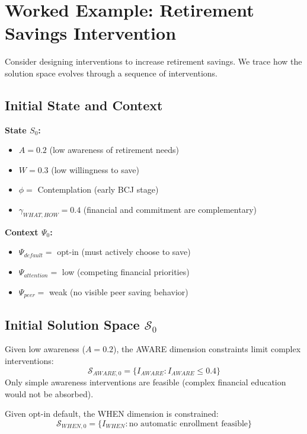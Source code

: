 \section{Worked Example: Retirement Savings Intervention}
\label{sec:ss-example}

Consider designing interventions to increase retirement savings. We trace how the solution space evolves through a sequence of interventions.

\subsection{Initial State and Context}

\textbf{State $S_0$:}
\begin{itemize}
    \item $A = 0.2$ (low awareness of retirement needs)
    \item $W = 0.3$ (low willingness to save)
    \item $\phi = $ Contemplation (early BCJ stage)
    \item $\gamma_{WHAT,HOW} = 0.4$ (financial and commitment are complementary)
\end{itemize}

\textbf{Context $\Psi_0$:}
\begin{itemize}
    \item $\Psi_{default} = $ opt-in (must actively choose to save)
    \item $\Psi_{attention} = $ low (competing financial priorities)
    \item $\Psi_{peer} = $ weak (no visible peer saving behavior)
\end{itemize}

\subsection{Initial Solution Space $\mathcal{S}_0$}

Given low awareness ($A = 0.2$), the AWARE dimension constraints limit complex interventions:
\begin{equation}
\mathcal{S}_{AWARE,0} = \{I_{AWARE} : I_{AWARE} \leq 0.4\}
\end{equation}
Only simple awareness interventions are feasible (complex financial education would not be absorbed).

Given opt-in default, the WHEN dimension is constrained:
\begin{equation}
\mathcal{S}_{WHEN,0} = \{I_{WHEN} : \text{no automatic enrollment feasible}\}
\end{equation}


